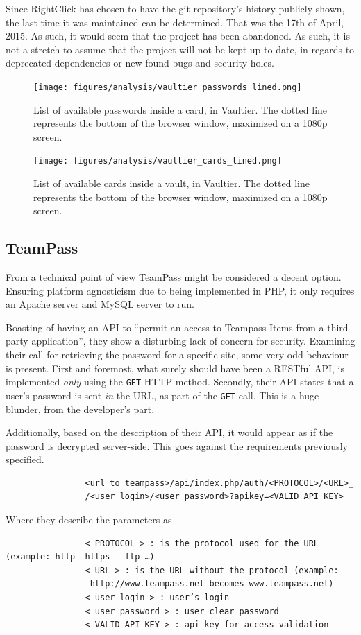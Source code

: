 			Since RightClick has chosen to have the git repository's history publicly shown, the last time it was maintained can be determined. That was the 17th of April, 2015\cite{vaultier_history}. As such, it would seem that the project has been abandoned. As such, it is not a stretch to assume that the project will not be kept up to date, in regards to deprecated dependencies or new-found bugs and security holes.



			\begin{figure}[htbp]
				\centering
				\texttt{[image: figures/analysis/vaultier\_passwords\_lined.png]}
				\caption{List of available passwords inside a card, in Vaultier. The dotted line represents the bottom of the browser window, maximized on a 1080p screen.}
				\label{fig:vaultier_passwords}
			\end{figure}
			\begin{figure}[htbp]
				\centering
				\texttt{[image: figures/analysis/vaultier\_cards\_lined.png]}
				\caption{List of available cards inside a vault, in Vaultier. The dotted line represents the bottom of the browser window, maximized on a 1080p screen.}
				\label{fig:vaultier_cards}
			\end{figure}

		\subsection*{TeamPass}
			From a technical point of view TeamPass might be considered a decent option. Ensuring platform agnosticism due to being implemented in PHP, it only requires an Apache server and MySQL server to run. 

			Boasting of having an API to ``permit an access to Teampass Items from a third party application'', they show a disturbing lack of concern for security. Examining their call for retrieving the password for a specific site, some very odd behaviour is present. First and foremost, what surely should have been a RESTful API, is implemented \emph{only} using the \verb=GET= HTTP method. Secondly, their API states that a user's password is sent \emph{in} the URL, as part of the \verb=GET= call. This is a huge blunder, from the developer's part. 

			Additionally, based on the description of their API, it would appear as if the password is decrypted server-side. This goes against the requirements previously specified.
			\begin{verbatim}
				<url to teampass>/api/index.php/auth/<PROTOCOL>/<URL>_
				/<user login>/<user password>?apikey=<VALID API KEY>
			\end{verbatim}
			Where they describe the parameters as
			\begin{verbatim}
				< PROTOCOL > : is the protocol used for the URL (example: http	https	ftp	…)
				< URL > : is the URL without the protocol (example:_
				 http://www.teampass.net becomes www.teampass.net)
				< user login > : user’s login
				< user password > : user clear password
				< VALID API KEY > : api key for access validation
			\end{verbatim}

